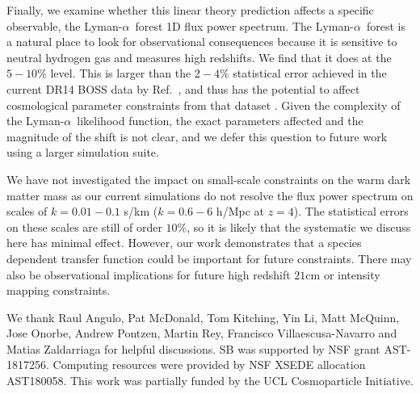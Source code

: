 \documentclass[a4paper,11pt]{article}
\newcommand{\Lya}{Lyman-$\alpha$}
\begin{document}
Finally, we examine whether this linear theory prediction affects a specific observable, the \Lya~forest 1D flux power spectrum. The \Lya~forest is a natural place to look for observational consequences because it is sensitive to neutral hydrogen gas and measures high redshifts.
We find that it does at the $5-10\%$ level. This is larger than the $2-4\%$ statistical error achieved in the current DR14 BOSS data by Ref.~\cite{Chabanier:2019}, and thus has the potential to affect cosmological parameter constraints from that dataset \cite[e.g][]{PD2019}. Given the complexity of the \Lya~likelihood function, the exact parameters affected and the magnitude of the shift is not clear, and we defer this question to future work using a larger simulation suite.

We have not investigated the impact on small-scale constraints on the warm dark matter mass \cite{Irsic:2017} as our current simulations do not resolve the flux power spectrum on scales of $k = 0.01 - 0.1$ s/km ($k = 0.6 - 6$ h/Mpc at $z = 4$). The statistical errors on these scales are still of order $10\%$, so it is likely that the systematic we discuss here has minimal effect. However, our work demonstrates that a species dependent transfer function could be important for future constraints. There may also be observational implications for future high redshift $21$cm or intensity mapping constraints.


\acknowledgments

We thank Raul Angulo, Pat McDonald, Tom Kitching, Yin Li, Matt McQuinn, Jose Onorbe, Andrew Pontzen, Martin Rey, Francisco Villaescusa-Navarro and Matias Zaldarriaga for helpful discussions. SB was supported by NSF grant AST-1817256. Computing resources were provided by NSF XSEDE allocation AST180058. This work was partially funded by the UCL Cosmoparticle Initiative.
\end{document}
